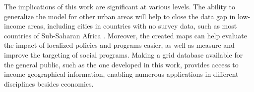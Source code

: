 \documentclass[conference]{IEEEtran}
\begin{document}
The implications of this work are significant at various levels. The ability to generalize the model for other urban areas will help to close the data gap in low-income areas, including cities in countries with no survey data, such as most countries of Sub-Saharan Africa \citep{burke2021}. Moreover, the created maps can help evaluate the impact of localized policies and programs easier, as well as measure and improve the targeting of social programs. Making a grid database available for the general public, such as the one developed in this work, provides access to income geographical information, enabling numerous applications in different disciplines besides economics.






\end{document}
